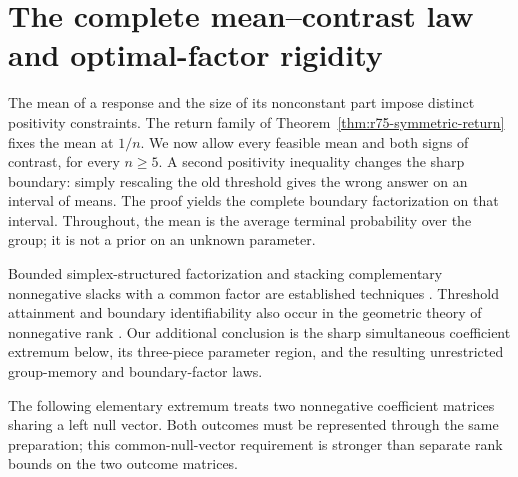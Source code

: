 \section{The complete mean--contrast law and optimal-factor rigidity}
\label{sec:r76-mean-contrast}

The mean of a response and the size of its nonconstant part impose distinct
positivity constraints. The return family of
Theorem~\ref{thm:r75-symmetric-return} fixes the mean at $1/n$.
We now allow every feasible mean and both signs of contrast, for every
$n\ge5$. A second positivity inequality changes the sharp boundary: simply
rescaling the old threshold gives the wrong answer on an interval of means.
The proof yields the complete boundary factorization on that interval.
Throughout, the mean is the average terminal probability over the group;
it is not a prior on an unknown parameter.

Bounded simplex-structured factorization and stacking complementary
nonnegative slacks with a common factor are established techniques
\cite[Section IV-C]{VuThanhGillisLecron23}. Threshold attainment and
boundary identifiability also occur in the geometric theory of nonnegative
rank \cite[Section 4.3]{Gillis12}. Our additional conclusion is the sharp
simultaneous coefficient extremum below, its three-piece parameter region,
and the resulting unrestricted group-memory and boundary-factor laws.

The following elementary extremum treats two nonnegative coefficient
matrices sharing a left null vector. Both outcomes must be represented
through the same preparation; this common-null-vector requirement is
stronger than separate rank bounds on the two outcome matrices.

